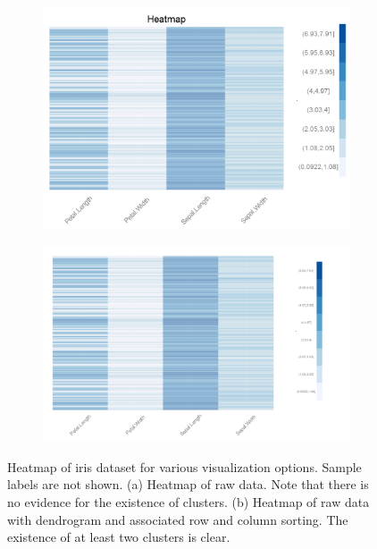 \documentclass[12pt]{article}
\begin{document}
\begin{figure}[t!]
	\centering
	\begin{subfigure}[b]{0.8\textwidth}
		\includegraphics[width=\textwidth]{Figures/Iris/HeatmapRawnodendro.png}
		\subcaption{}
		\label{fig:FigHeatmapRawnodendro}
	\end{subfigure}
	\begin{subfigure}[b]{0.8\textwidth}
		\includegraphics[width=\textwidth]{Figures/Iris/HeatmapRaw.png}
		\subcaption{}
		\label{fig:FigHeatmapRaw}
	\end{subfigure}
	\caption{Heatmap of iris dataset for various visualization options. Sample labels are not shown. (a) Heatmap of raw data. Note that there is no evidence for the existence of clusters. (b) Heatmap of raw data with dendrogram and associated row and column sorting. The existence of at least two clusters is clear.}
	\label{fig:FigHeatmap}
\end{figure}
\end{document}
